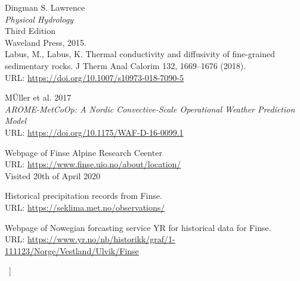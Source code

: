\documentclass[a4paper,11pt,twocolumn]{article}
\begin{document}
\begin{@twocolumnfalse}


\medskip

\begin{thebibliography}{9}

Dingman S. Lawrence \\
\textit{Physical Hydrology}\\
Third Edition \\
Waveland Press, 2015.\\

Labus, M., Labus, K. Thermal conductivity and diffusivity of fine-grained sedimentary rocks. J Therm Anal Calorim 132, 1669–1676 (2018). \\
URL: \url{https://doi.org/10.1007/s10973-018-7090-5}

MÜller et al. 2017\\
\textit{AROME-MetCoOp: A Nordic Convective-Scale Operational
Weather Prediction Model}\\
URL: \url{https://doi.org/10.1175/WAF-D-16-0099.1}

Webpage of Finse Alpine Research Ceenter\\
URL: \url{https://www.finse.uio.no/about/location/}\\
Visited 20th of April 2020

Historical precipitation records from Finse.\\
URL: \url{https://seklima.met.no/observations/}

Webpage of Nowegian forcasting service YR for historical data for Finse.\\
URL: \url{https://www.yr.no/nb/historikk/graf/1-111123/Norge/Vestland/Ulvik/Finse}


\end{thebibliography} 


\end{@twocolumnfalse}
\
]
\end{document}
